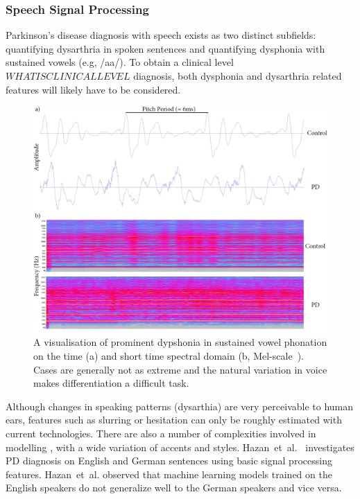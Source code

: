 \documentclass[12pt, twoside]{book}
\renewcommand\emph[1]{\textit{\color{USred}{#1}}}
\begin{document}
\subsubsection{Speech Signal Processing}
Parkinson's disease diagnosis with speech exists as two distinct subfields: quantifying dysarthria in spoken sentences and quantifying dysphonia with sustained vowels (e.g, /aa/). To obtain a clinical level $WHAT IS CLINICAL LEVEL$ diagnosis, both dysphonia and dysarthria related features will likely have to be considered.


\begin{figure}[h]
	\label{spectrogram}
	\centering\centerline{\includegraphics[width=1.2\linewidth]{timespectrogram.png}}
	\caption{A visualisation of prominent dypshonia in sustained vowel phonation on the time (a) and short time spectral domain (b, Mel-scale~\cite{mfscale}). Cases are generally not as extreme and the natural variation in voice makes differentiation a difficult task.}
\end{figure}


Although changes in speaking patterns (dysarthia) are very perceivable to human ears, features such as slurring or hesitation can only be roughly estimated with current technologies. There are also a number of complexities involved in modelling \emph{spoken language}, with a wide variation of accents and styles. Hazan~et~al.~\cite{hazan2012} investigates PD diagnosis on English and German sentences using basic signal processing features. Hazan~et~al. observed that machine learning models trained on the English speakers do not generalize well to the German speakers and vice versa. 
\end{document}
